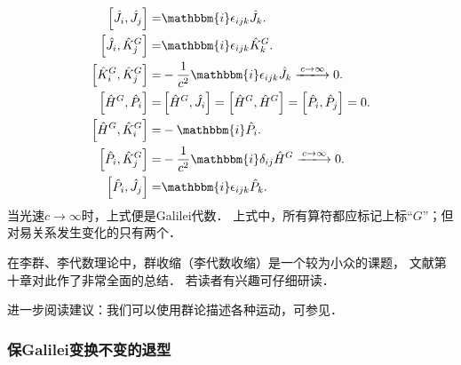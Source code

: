 \begin{subequations}
    \begin{align}
        \left[\hat{J}_i, \hat{J}_j \right] =& \mathbbm{i} \epsilon_{ijk} \hat{J}_k . \\
        \left[\hat{J}_i, \hat{K}_j^G\right] =& \mathbbm{i} \epsilon_{ijk} \hat{K}_k ^G. \\
        \left[\hat{K}_i^G, \hat{K}_j^G\right] =& -\frac{1}{c^2}\mathbbm{i}\epsilon_{ijk} \hat{J}_k 
        \xlongrightarrow{c\to \infty} 0. \\
        \left[\hat{H}^G, \hat{P}_i \right] =& \left[\hat{H}^G, \hat{J}_i \right]
        =\left[\hat{H}^G, \hat{H}^G \right] =\left[\hat{P}_i, \hat{P}_j \right] =0 . \\
        \left[\hat{H}^G, \hat{K}^G_i \right] = & -\mathbbm{i} \hat{P}_i .\\
        \left[\hat{P}_i, \hat{K}^G_j \right] =& -\frac{1}{c^2}\mathbbm{i} \delta_{ij} \hat{H}^G 
        \xlongrightarrow{c\to \infty} 0.\\
        \left[\hat{P}_i, \hat{J}_j \right] =& \mathbbm{i} \epsilon_{ijk} \hat{P}_k .
    \end{align}
\end{subequations}
当光速$c\to \infty$时，上式便是Galilei代数．
上式中，所有算符都应标记上标“$G$”；但对易关系发生变化的只有两个．

在李群、李代数理论中，群收缩（李代数收缩）是一个较为小众的课题，
文献\parencite{Gilmore-1974}第十章对此作了非常全面的总结．
若读者有兴趣可仔细研读．

进一步阅读建议：我们可以使用群论描述各种运动，可参见\parencite{McRae-2007}．


\subsubsection{保Galilei变换不变的退型}\label{chlg:sec_Galilei-metric}


